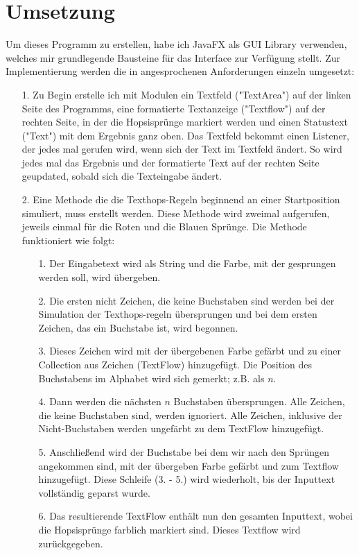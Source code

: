 \documentclass[a4paper,10pt,ngerman]{scrartcl}
\begin{document}
\section{Umsetzung}
Um dieses Programm zu erstellen, habe ich JavaFX als GUI Library verwenden, welches mir grundlegende Bausteine für das Interface zur Verfügung stellt. Zur Implementierung werden die in  angesprochenen Anforderungen einzeln umgesetzt:

\begin{itemize}
  \item [1.] Zu Begin erstelle ich mit Modulen ein Textfeld ("TextArea") auf der linken Seite des Programms, eine formatierte Textanzeige ("Textflow") auf der rechten Seite, in der die Hopsisprünge markiert werden und einen Statustext ("Text") mit dem Ergebnis ganz oben.
  Das Textfeld bekommt einen Listener, der jedes mal gerufen wird, wenn sich der Text im Textfeld ändert. So wird jedes mal das Ergebnis und der formatierte Text auf der rechten Seite geupdated, sobald sich die Texteingabe ändert.
  \item [2.] Eine Methode die die Texthops-Regeln beginnend an einer Startposition simuliert, muss erstellt werden. Diese Methode wird zweimal aufgerufen, jeweils einmal für die Roten und die Blauen Sprünge. Die Methode funktioniert wie folgt:
  \begin{itemize}
    \item [1.] Der Eingabetext wird als String und die Farbe, mit der gesprungen werden soll, wird übergeben.
    \item [2.] Die ersten nicht Zeichen, die keine Buchstaben sind werden bei der Simulation der Texthops-regeln übersprungen und bei dem ersten Zeichen, das ein Buchstabe ist, wird begonnen.
    \item [3.] Dieses Zeichen wird mit der übergebenen Farbe gefärbt und zu einer Collection aus Zeichen (TextFlow) hinzugefügt. Die Position des Buchstabens im Alphabet wird sich gemerkt; z.B. als $n$.
    \item [4.] Dann werden die nächsten $n$ Buchstaben übersprungen. Alle Zeichen, die keine Buchstaben sind, werden ignoriert. Alle Zeichen, inklusive der Nicht-Buchstaben werden ungefärbt zu dem TextFlow hinzugefügt.
    \item [5.] Anschließend wird der Buchstabe bei dem wir nach den Sprüngen angekommen sind, mit der übergeben Farbe gefärbt und zum Textflow hinzugefügt. Diese Schleife (3. - 5.) wird wiederholt, bis der Inputtext vollständig geparst wurde.
    \item [6.] Das resultierende TextFlow enthält nun den gesamten Inputtext, wobei die Hopsisprünge farblich markiert sind. Dieses Textflow wird zurückgegeben.

\end{itemize}
\end{itemize}
\end{document}
